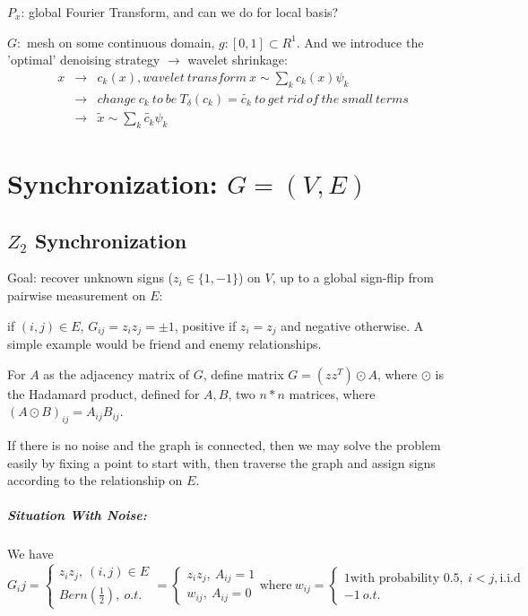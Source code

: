 \documentclass[11pt,letter]{article}
\begin{document}
$P_x$: global Fourier Transform, and can we do for local basis?

$G:$ mesh on some continuous domain, $g:[0,1]\subset R^1$. And we introduce the 'optimal' denoising strategy $\to$ wavelet shrinkage:
\begin{eqnarray}
x &\to & c_k(x), wavelet\ transform\ x \sim \sum_kc_k(x)\psi_k \nonumber \\
&\to & change\ c_k\ to\ be\ T_{\delta}(c_k)=\tilde{c_k}\ to\ get\ rid\ of\ the\ small\ terms \nonumber \\
&\to & \tilde{x}\sim \sum_{k} \tilde{c_k}\psi_k
\end{eqnarray}

\section{Synchronization: $G=(V,E)$}

\subsection{$Z_2$ Synchronization}

Goal: recover unknown signs ($z_i \in \{1,-1\}$) on $V$, up to a global sign-flip from pairwise measurement on $E$:

if $(i,j)\in E$, $G_{ij}=z_iz_j=\pm1$, positive if $z_i=z_j$ and negative otherwise. A simple example would be friend and enemy relationships.

For $A$ as the adjacency matrix of $G$, define matrix $G=(zz^T) \odot A$, where $\odot$ is the Hadamard product, defined for $A,B$, two $n*n$ matrices, where $(A\odot B)_{ij}=A_{ij}B_{ij}$.

If there is no noise and the graph is connected, then we may solve the problem easily by fixing a point to start with, then traverse the graph and assign signs according to the relationship on $E$.

\subparagraph{Situation With Noise:}

We have 
\begin{equation}
G_ij = 
	\begin{cases}
		z_iz_j,\ (i,j)\in E \\
		Bern(\frac{1}{2}),\ o.t.
	\end{cases}
	=
	\begin{cases}
		z_iz_j,\ A_{ij}=1 \\
		w_{ij},\ A_{ij}=0
	\end{cases}
	\text{where}\ w_{ij}=
	\begin{cases}
		1 \text{with probability 0.5},\ i<j, \text{i.i.d}\\
		-1 \ o.t.
	\end{cases}
\end{equation}
\end{document}
